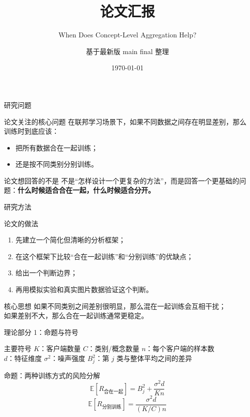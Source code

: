 \documentclass[aspectratio=169,11pt]{ctexbeamer}
\title{论文汇报}
\subtitle{When Does Concept-Level Aggregation Help?}
\author{基于最新版 main final 整理}
\date{\today}
\begin{document}
\begin{frame}
  \titlepage
\end{frame}

\begin{frame}{研究问题}
  \begin{block}{论文关注的核心问题}
    在联邦学习场景下，如果不同数据之间存在明显差别，那么训练时到底应该：
    \begin{itemize}
      \item 把所有数据合在一起训练；
      \item 还是按不同类别分别训练。
    \end{itemize}
  \end{block}

  \vspace{0.5em}
  \begin{block}{论文想回答的不是}
    不是“怎样设计一个更复杂的方法”，而是回答一个更基础的问题：\textbf{什么时候适合合在一起，什么时候适合分开。}
  \end{block}
\end{frame}

\begin{frame}{研究方法}
  \begin{block}{论文的做法}
    \begin{enumerate}
      \item 先建立一个简化但清晰的分析框架；
      \item 在这个框架下比较“合在一起训练”和“分别训练”的优缺点；
      \item 给出一个判断边界；
      \item 再用模拟实验和真实图片数据验证这个判断。
    \end{enumerate}
  \end{block}

  \vspace{0.5em}
  \begin{block}{核心思想}
    如果不同类别之间差别很明显，那么混在一起训练会互相干扰；\\[0.3em]
    如果差别不大，那么合在一起训练通常更稳定。
  \end{block}
\end{frame}

\begin{frame}{理论部分 1：命题与符号}
  \begin{block}{主要符号}
    \small
    $K$：客户端数量 \quad
    $C$：类别/概念数量 \quad
    $n$：每个客户端的样本数 \\[0.4em]
    $d$：特征维度 \quad
    $\sigma^2$：噪声强度 \quad
    $B_j^2$：第 $j$ 类与整体平均之间的差异
  \end{block}

  \vspace{0.4em}
  \begin{block}{命题：两种训练方式的风险分解}
    \small
    \[
    \mathbb{E}[R_{\text{合在一起}}] = B_j^2 + \frac{\sigma^2 d}{Kn}
    \]
    \[
    \mathbb{E}[R_{\text{分别训练}}] = \frac{\sigma^2 d}{(K/C)n}
    \]
  \end{block}
\end{frame}
\end{document}
